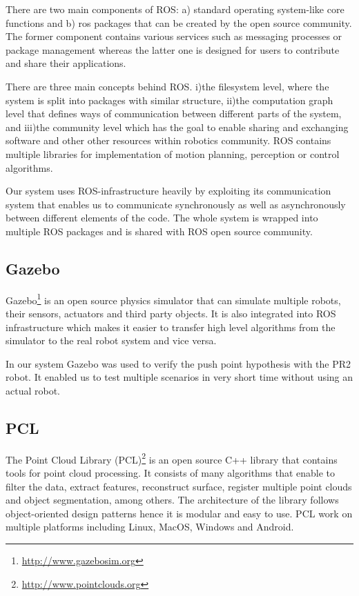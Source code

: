 There are two main components of ROS: a) standard operating system-like core functions and b) ros packages that can be created by the open source community. The former component contains various services such as messaging processes or package management whereas the latter one is designed for users to contribute and share their applications. 


There are three main concepts behind ROS. i)the filesystem level, where the system is split into packages with similar structure, ii)the computation graph level that defines ways of communication between different parts of the system, and iii)the community level which has the goal to enable sharing and exchanging software and other other resources within robotics community. ROS contains multiple libraries for implementation of motion planning, perception or control algorithms.

Our system uses ROS-infrastructure heavily by exploiting its communication system that enables us to communicate synchronously as well as asynchronously between different elements of the code. The whole system is wrapped into multiple ROS packages and is shared with ROS open source community.




\subsection{Gazebo}
Gazebo\footnote{\url{http://www.gazebosim.org}} is an open source physics simulator that can simulate multiple robots, their sensors, actuators and third party objects. It is also integrated into ROS infrastructure which makes it easier to transfer high level algorithms  from the simulator to the real robot system and vice versa.  

In our system Gazebo was used to verify the push point hypothesis with the PR2 robot. It enabled us to test multiple scenarios in very short time without using an actual robot.


\subsection{PCL}
The Point Cloud Library (PCL)\footnote{\url{http://www.pointclouds.org}} is an open source C++ library that contains tools for point cloud processing. It consists of many algorithms that enable to filter the data, extract features, reconstruct surface, register multiple point clouds and object segmentation, among others. The architecture of the library follows object-oriented design patterns hence it is modular and easy to use. PCL work on multiple platforms including Linux, MacOS, Windows and Android. 

